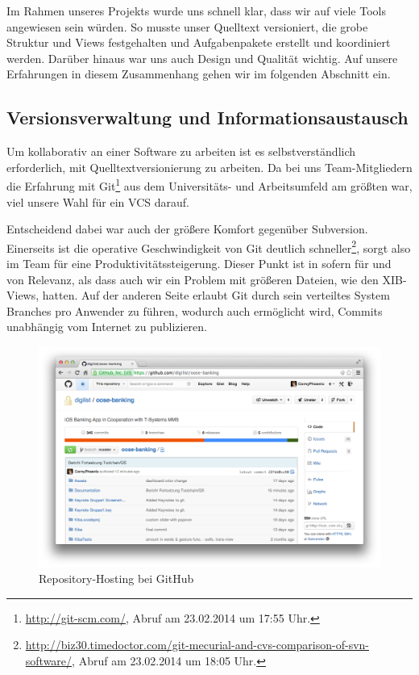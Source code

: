 Im Rahmen unseres Projekts wurde uns schnell klar, dass wir auf viele Tools angewiesen sein würden. So musste unser Quelltext versioniert, die grobe Struktur und Views festgehalten und Aufgabenpakete erstellt und koordiniert werden. Darüber hinaus war uns auch Design und Qualität wichtig. Auf unsere Erfahrungen in diesem Zusammenhang gehen wir im folgenden Abschnitt ein.

\subsection{Versionsverwaltung und Informationsaustausch}
	Um kollaborativ an einer Software zu arbeiten ist es selbstverständlich erforderlich, mit Quelltextversionierung zu arbeiten. Da bei uns Team-Mitgliedern die Erfahrung mit Git\footnote{\url{http://git-scm.com/}, Abruf am 23.02.2014 um 17:55 Uhr.} aus dem Universitäts- und Arbeitsumfeld am größten war, viel unsere Wahl für ein \acs{VCS} darauf.
	
	Entscheidend dabei war auch der größere Komfort gegenüber Subversion. Einerseits ist die operative Geschwindigkeit von Git deutlich schneller\footnote{\url{http://biz30.timedoctor.com/git-mecurial-and-cvs-comparison-of-svn-software/}, Abruf am 23.02.2014 um 18:05 Uhr.}, sorgt also im Team für eine Produktivitätssteigerung. Dieser Punkt ist in sofern für und von Relevanz, als dass auch wir ein Problem mit größeren Dateien, wie den XIB-Views, hatten. Auf der anderen Seite erlaubt Git durch sein verteiltes System Branches pro Anwender zu führen, wodurch auch ermöglicht wird, Commits  unabhängig vom Internet zu publizieren. 

\begin{figure}[h]
	\centering
	\includegraphics[scale=.25]{Pictures/GitHubOverview}
	\caption{Repository-Hosting bei GitHub \label{fig:GitHubOverview}}
\end{figure}
	
